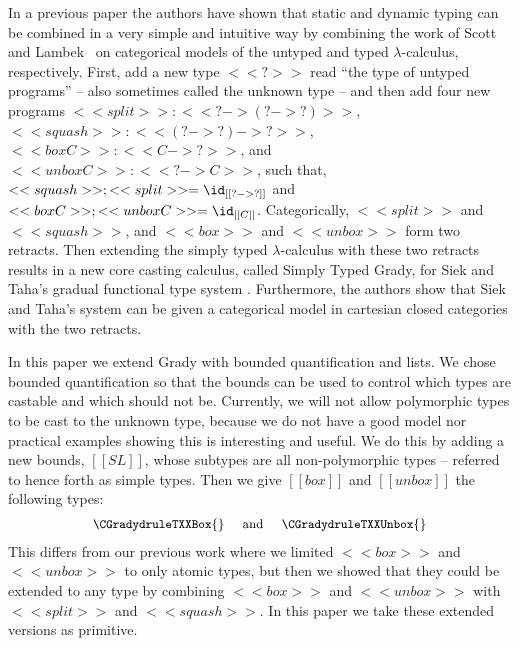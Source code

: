 In a previous paper the authors \cite{Eades:2017} have shown that
static and dynamic typing can be combined in a very simple and
intuitive way by combining the work of Scott~\cite{Scott:1980} and
Lambek~\cite{Lambek:1980} on categorical models of the untyped and
typed $\lambda$-calculus, respectively.  First, add a new type $<<?>>$
read ``the type of untyped programs'' -- also sometimes called the
unknown type -- and then add four new programs
$<<split>> : <<? -> (? -> ?)>>$, $ <<squash>> : <<(? -> ?) -> ?>> $,
$<<box C>> : <<C -> ?>>$, and $<<unbox C>> : <<? -> C>>$, such that,
$<<squash>>;<<split>> = \id_{[[? -> ?]]}$ and
$<<box C>>;<<unbox C>> = \id_{[[C]]}$.
Categorically, $<<split>>$ and $<<squash>>$, and $<<box>>$ and
$<<unbox>>$ form two retracts.  Then extending the simply typed
$\lambda$-calculus with these two retracts results in a new core
casting calculus, called Simply Typed Grady, for Siek and Taha's
gradual functional type system \cite{Siek:2015}.  Furthermore, the
authors show that Siek and Taha's system can be given a categorical
model in cartesian closed categories with the two retracts.

In this paper we extend Grady with bounded quantification and lists.
We chose bounded quantification so that the bounds can be used to
control which types are castable and which should not be.  Currently,
we will not allow polymorphic types to be cast to the unknown type,
because we do not have a good model nor practical examples showing
this is interesting and useful.  We do this by adding a new bounds,
$[[SL]]$, whose subtypes are all non-polymorphic types -- referred to
hence forth as simple types.  Then we give $[[box]]$ and $[[unbox]]$
the following types:
\[\small
\begin{array}{lll}
  \CGradydruleTXXBox{} & \text{ and } & \CGradydruleTXXUnbox{}
\end{array}
\]
This differs from our previous work where we limited $<<box>>$ and
$<<unbox>>$ to only atomic types, but then we showed that they could
be extended to any type by combining $<<box>>$ and $<<unbox>>$ with
$<<split>>$ and $<<squash>>$.  In this paper we take these extended
versions as primitive.

